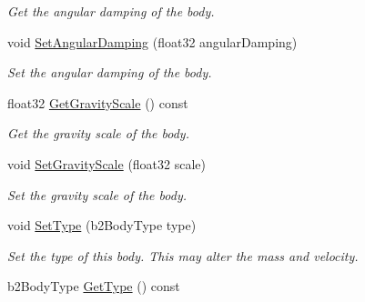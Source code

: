 \begin{DoxyCompactItemize}
\begin{DoxyCompactList}\small\item\em Get the angular damping of the body. \end{DoxyCompactList}\item 
void \hyperlink{classb2_body_a73a79541b18394fa224d2eae8ad493e8}{Set\+Angular\+Damping} (float32 angular\+Damping)\hypertarget{classb2_body_a73a79541b18394fa224d2eae8ad493e8}{}\label{classb2_body_a73a79541b18394fa224d2eae8ad493e8}

\begin{DoxyCompactList}\small\item\em Set the angular damping of the body. \end{DoxyCompactList}\item 
float32 \hyperlink{classb2_body_ad8348f06a391d169d6395dfd66762454}{Get\+Gravity\+Scale} () const \hypertarget{classb2_body_ad8348f06a391d169d6395dfd66762454}{}\label{classb2_body_ad8348f06a391d169d6395dfd66762454}

\begin{DoxyCompactList}\small\item\em Get the gravity scale of the body. \end{DoxyCompactList}\item 
void \hyperlink{classb2_body_a8e66a570c2aeee93b29d84cae861a612}{Set\+Gravity\+Scale} (float32 scale)\hypertarget{classb2_body_a8e66a570c2aeee93b29d84cae861a612}{}\label{classb2_body_a8e66a570c2aeee93b29d84cae861a612}

\begin{DoxyCompactList}\small\item\em Set the gravity scale of the body. \end{DoxyCompactList}\item 
void \hyperlink{classb2_body_a34ff1c84b10b74eb990749a025a1b1ad}{Set\+Type} (b2\+Body\+Type type)\hypertarget{classb2_body_a34ff1c84b10b74eb990749a025a1b1ad}{}\label{classb2_body_a34ff1c84b10b74eb990749a025a1b1ad}

\begin{DoxyCompactList}\small\item\em Set the type of this body. This may alter the mass and velocity. \end{DoxyCompactList}\item 
b2\+Body\+Type \hyperlink{classb2_body_aa0d5acad4f0104e709e34e29a4a0c1a4}{Get\+Type} () const \hypertarget{classb2_body_aa0d5acad4f0104e709e34e29a4a0c1a4}{}\label{classb2_body_aa0d5acad4f0104e709e34e29a4a0c1a4}


\end{DoxyCompactItemize}
